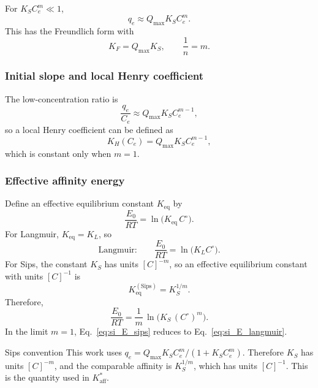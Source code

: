 \documentclass[journal=jacsat,manuscript=article]{achemso}
\begin{document}
For \(K_S C_e^{m} \ll 1\),
\begin{equation}
	q_e \approx Q_{\max} K_S C_e^{m}.
\end{equation}
This has the Freundlich form with
\begin{equation}
	K_F = Q_{\max} K_S,
	\qquad \frac{1}{n} = m.
\end{equation}

\subsubsection{Initial slope and local Henry coefficient}

The low-concentration ratio is
\begin{equation}
	\frac{q_e}{C_e}
	\approx Q_{\max} K_S C_e^{m-1},
\end{equation}
so a local Henry coefficient can be defined as
\begin{equation}
	K_H(C_e) = Q_{\max} K_S C_e^{m - 1},
\end{equation}
which is constant only when \(m = 1\).

\subsubsection{Effective affinity energy}

Define an effective equilibrium constant \(K_{\mathrm{eq}}\) by
\begin{equation}
	\frac{E_0}{RT} = \ln\!\big(K_{\mathrm{eq}}\,C^\circ\big).
	\label{eq:si_E_def}
\end{equation}
For Langmuir, \(K_{\mathrm{eq}} = K_L\), so
\begin{equation}
	\text{Langmuir:}\qquad
	\frac{E_0}{RT} = \ln\!\big(K_L C^\circ\big).
	\label{eq:si_E_langmuir}
\end{equation}
For Sips, the constant \(K_S\) has units \([C]^{-m}\), so an effective
equilibrium constant with units \([C]^{-1}\) is
\begin{equation}
	K_{\mathrm{eq}}^{\mathrm{(Sips)}} = K_S^{1/m}.
\end{equation}
Therefore,
\begin{equation}
	\frac{E_0}{RT}
	= \frac{1}{m}\,\ln\!\big(K_S\,(C^\circ)^{m}\big).
	\label{eq:si_E_sips}
\end{equation}
In the limit \(m = 1\), Eq.~\eqref{eq:si_E_sips} reduces to
Eq.~\eqref{eq:si_E_langmuir}.

\begin{bluebox}{Sips convention}
	This work uses \(q_e=Q_{\max}K_S C_e^m/(1+K_S C_e^m)\). Therefore
	\(K_S\) has units \([C]^{-m}\), and the comparable affinity is
	\(K_S^{1/m}\), which has units \([C]^{-1}\). This is the quantity used
	in \(K_{\mathrm{aff}}^{\ast}\).
\end{bluebox}
\end{document}
